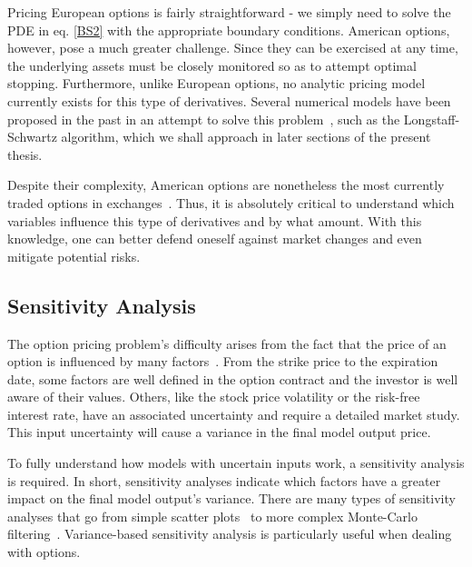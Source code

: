 \documentclass[a4paper,twocolumn,aps,prd,longbibliography,superscriptaddress]{revtex4-1}
\begin{document}
Pricing European options is fairly straightforward - we simply need to solve the PDE in eq. \eqref{BS2} with the appropriate boundary conditions. American options, however, pose a much greater challenge. Since they can be exercised at any time, the underlying assets must be closely monitored so as to attempt optimal stopping.
Furthermore, unlike European options, no analytic pricing model currently exists for this type of derivatives. Several numerical models have been proposed in the past in an attempt to solve this problem~\cite{Hull}, such as the Longstaff-Schwartz algorithm, which we shall approach in later sections of the present thesis.

Despite their complexity, American options are nonetheless the most currently traded options in exchanges~\cite{Hull}. Thus, it is absolutely critical to understand which variables influence this type of derivatives and by what amount. With this knowledge, one can better defend oneself against market changes and even mitigate potential risks.

\subsection{Sensitivity Analysis}
The option pricing problem's difficulty arises from the fact that the price of an option is influenced by many factors~\cite{Hull}.
From the strike price to the expiration date, some factors are well defined in the option contract and the investor is well aware of their values. Others, like the stock price volatility or the risk-free interest rate, have an associated uncertainty and require a detailed market study. This input uncertainty will cause a variance in the final model output price.

To fully understand how models with uncertain inputs work, a sensitivity analysis is required. In short, sensitivity analyses indicate which factors have a greater impact on the final model output's variance.
There are many types of sensitivity analyses that go from simple scatter plots~\cite{Saltelli} to more complex Monte-Carlo filtering~\cite{Saltelli}. Variance-based sensitivity analysis is particularly useful when dealing with options.
\end{document}
